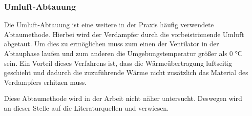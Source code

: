 \subsubsection*{Umluft-Abtauung}

Die Umluft-Abtauung ist eine weitere in der Praxis häufig verwendete Abtaumethode. Hierbei wird der Verdampfer durch die vorbeiströmende Umluft abgetaut. Um dies zu ermöglichen muss zum einen der Ventilator in der Abtauphase laufen und zum anderen die Umgebungstemperatur größer als 0 $°$C sein. Ein Vorteil dieses Verfahrens ist, dass die Wärmeübertragung luftseitig geschieht und dadurch die zuzuführende Wärme nicht zusätzlich das Material des Verdampfers erhitzen muss. 

Diese Abtaumethode wird in der Arbeit nicht näher untersucht. Deswegen wird an dieser Stelle auf die  Literaturquellen \citep{Breidenbach2014} und \citep{Ehrbar2002} verwiesen. 





